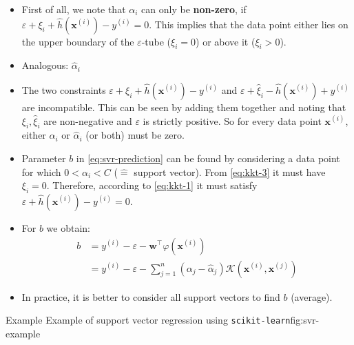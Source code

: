 \begin{frame}
	\begin{itemize}
		\item First of all, we note that $\alpha_i$ can only be \textbf{non-zero}, if $\varepsilon + \xi_i + \widehat{h}(\bm{x}^{(i)}) - y^{(i)} = 0$. This implies that the data point either lies
			on the upper boundary of the $\varepsilon$-tube ($\xi_i = 0$) or above it ($\xi_i > 0$).
		\item Analogous: $\widehat{\alpha}_i$
		\item The two constraints $\varepsilon + \xi_i + \widehat{h}(\bm{x}^{(i)}) - y^{(i)}$ and $\varepsilon + \widehat{\xi}_i - \widehat{h}(\bm{x}^{(i)}) + y^{(i)}$ are incompatible.
			This can be seen by adding them together and noting that $\xi_i, \widehat{\xi}_i$ are non-negative and $\varepsilon$ is strictly positive. So for every data point
			$\bm{x}^{(i)}$, either $\alpha_i$ or $\widehat{\alpha}_i$ (or both) must be zero.
		\item Parameter $b$ in \cref{eq:svr-prediction} can be found by considering a data point for which $0 < \alpha_i < C$ ($\widehat{=}$ support vector).
			From \cref{eq:kkt-3} it must have $\xi_i = 0$. Therefore, according to \cref{eq:kkt-1} it must satisfy $\varepsilon + \widehat{h}(\bm{x}^{(i)}) - y^{(i)} = 0$.
		\item For $b$ we obtain:
		\begin{align}
			b 
				&= y^{(i)} - \varepsilon - \bm{w}^{\intercal} \varphi(\bm{x}^{(i)}) \\[1mm]
				&= y^{(i)} - \varepsilon - \sum_{j=1}^n (\alpha_j - \widehat{\alpha}_j) \mathcal{K}(\bm{x}^{(i)}, \bm{x}^{(j)})
		\end{align}
		\item In practice, it is better to consider all support vectors to find $b$ (average).
	\end{itemize}
\end{frame}


\begin{dwHeaderFrame}{Example}
		{Example of support vector regression using \texttt{scikit-learn}}{fig:svr-example}
\end{dwHeaderFrame}


\makethanks


